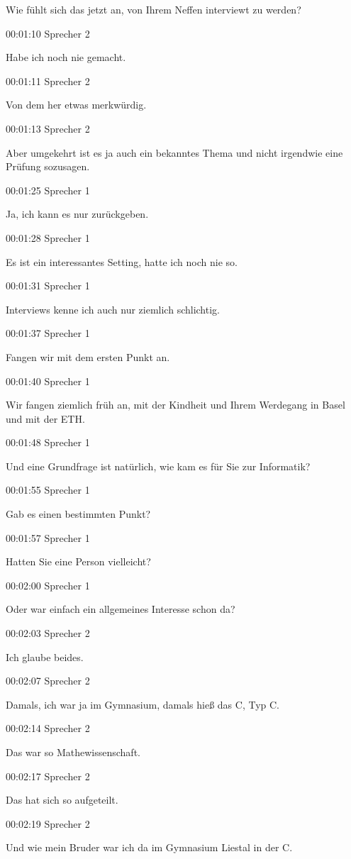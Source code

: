 Wie fühlt sich das jetzt an, von Ihrem Neffen interviewt zu werden?

00:01:10 Sprecher 2

Habe ich noch nie gemacht.

00:01:11 Sprecher 2

Von dem her etwas merkwürdig.

00:01:13 Sprecher 2

Aber umgekehrt ist es ja auch ein bekanntes Thema und nicht irgendwie
eine Prüfung sozusagen.

00:01:25 Sprecher 1

Ja, ich kann es nur zurückgeben.

00:01:28 Sprecher 1

Es ist ein interessantes Setting, hatte ich noch nie so.

00:01:31 Sprecher 1

Interviews kenne ich auch nur ziemlich schlichtig.

00:01:37 Sprecher 1

Fangen wir mit dem ersten Punkt an.

00:01:40 Sprecher 1

Wir fangen ziemlich früh an, mit der Kindheit und Ihrem Werdegang in
Basel und mit der ETH.

00:01:48 Sprecher 1

Und eine Grundfrage ist natürlich, wie kam es für Sie zur Informatik?

00:01:55 Sprecher 1

Gab es einen bestimmten Punkt?

00:01:57 Sprecher 1

Hatten Sie eine Person vielleicht?

00:02:00 Sprecher 1

Oder war einfach ein allgemeines Interesse schon da?

00:02:03 Sprecher 2

Ich glaube beides.

00:02:07 Sprecher 2

Damals, ich war ja im Gymnasium, damals hieß das C, Typ C.

00:02:14 Sprecher 2

Das war so Mathewissenschaft.

00:02:17 Sprecher 2

Das hat sich so aufgeteilt.

00:02:19 Sprecher 2

Und wie mein Bruder war ich da im Gymnasium Liestal in der C.


